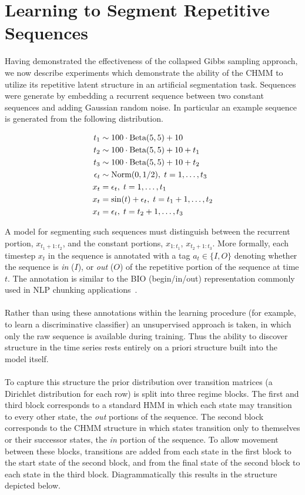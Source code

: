 \documentclass[12pt]{report}
\newcommand{\1}[0]{\mathbbm{1}}
\newcommand{\Beta}[0]{\textnormal{Beta}}
\newcommand{\Norm}[0]{\textnormal{Norm}}
\newcommand{\seq}[3]{\ensuremath{#1_{{#2}:{#3}}}}
\begin{document}
\section{Learning to Segment Repetitive Sequences}
\label{sec:Learning to Segment Repetitive Sequences}
Having demonstrated the effectiveness of the collapsed Gibbs sampling approach,
we now describe experiments which demonstrate the ability of the \ac{CHMM} to utilize its repetitive
latent structure in an artificial segmentation task. Sequences were generate by
embedding a recurrent sequence between two constant sequences and adding Gaussian random noise.
In particular an example sequence is generated from the following distribution.

\begin{align*}
    t_1 & \sim 100 \cdot \Beta(5, 5) + 10 \\
    t_2 & \sim 100 \cdot \Beta(5, 5) + 10 + t_1 \\
    t_3 & \sim 100 \cdot \Beta(5, 5) + 10 + t_2 \\
    \epsilon_t & \sim \Norm(0, 1/2),\; t = 1,\ldots,t_3 \\
    x_t &= \epsilon_t,\; t=1,\ldots,t_1 \\
    x_t &= \sin(t) + \epsilon_t,\; t=t_1+1,\ldots,t_2 \\
    x_t &= \epsilon_t,\; t=t_2 + 1,\ldots,t_3\\
\end{align*}

A model for segmenting such sequences must distinguish between the recurrent portion,
$\seq{x}{t_1+1}{t_2}$, and the constant portions, $\seq{x}{1}{t_1}$, $\seq{x}{t_2+1}{t_3}$.
More formally, each timestep $x_t$ in the sequence is annotated with a tag $a_t \in \{I, O\}$
denoting whether the sequence is \emph{in} ($I$), or \emph{out} ($O$) of the repetitive portion
of the sequence at time $t$. The annotation is similar to the BIO (begin/in/out) representation
commonly used in \ac{NLP} chunking applications~\cite{ramshaw-bio}.
\\\\
Rather than using these annotations within the learning procedure (for example, to learn a
discriminative classifier) an unsupervised approach is taken, in which only the raw sequence
is available during training. Thus the ability to discover structure in the time series rests
entirely on a priori structure built into the model itself.
\\\\
To capture this structure the prior distribution over transition matrices
(a Dirichlet distribution for each row) is split into three regime blocks.
The first and third block corresponds to a standard \ac{HMM}
in which each state may transition to every other state, the \emph{out} portions of the sequence.
The second block corresponds to the \ac{CHMM} structure in which states transition
only to themselves or their successor states, the \emph{in} portion of the sequence.
To allow movement between these blocks, transitions are added from each state in the first block
to the start state of the second block, and from the final state of the second block to each state
in the third block. Diagrammatically this results in the structure depicted below.
\end{document}
